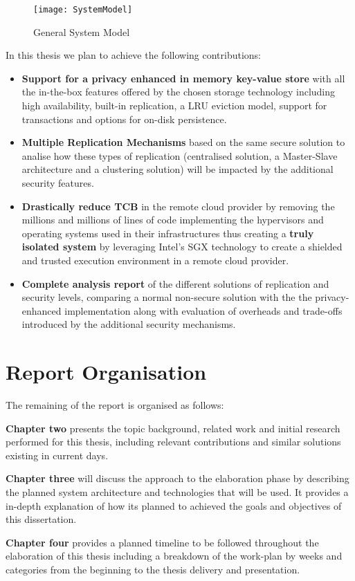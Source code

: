\begin{figure}[htbp]
	\centering
	{\texttt{[image: SystemModel]}}%
	\caption{General System Model}
	\label{fig:system_model}
\end{figure}

In this thesis we plan to achieve the following contributions:

\begin{itemize}
  \item \textbf{Support for a privacy enhanced in memory key-value store} with all the in-the-box features offered by the chosen storage technology including high availability, built-in replication, a \gls{LRU} eviction model, support for transactions and options for on-disk persistence.
  \item \textbf{Multiple Replication Mechanisms} based on the same secure solution to analise how these types of replication (centralised solution, a Master-Slave architecture and a clustering solution) will be impacted by the additional security features.
  \item \textbf{Drastically reduce TCB} in the remote cloud provider by removing the millions and millions of lines of code implementing the hypervisors and operating systems used in their infrastructures thus creating a \textbf{truly isolated system} by leveraging Intel's \gls{SGX} technology to create a shielded and trusted execution environment in a remote cloud provider.
  \item \textbf{Complete analysis report} of the different solutions of replication and security levels, comparing a normal non-secure solution with the the privacy-enhanced implementation along with evaluation of overheads and trade-offs introduced by the additional security mechanisms.
\end{itemize}

\section{Report Organisation}
\label{sec:report_organisation}

The remaining of the report is organised as follows:

\textbf{Chapter two} presents the topic background, related work and initial research performed for this thesis, including relevant contributions and similar solutions existing in current days.

\textbf{Chapter three} will discuss the approach to the elaboration phase by describing the planned system architecture and technologies that will be used. It provides a in-depth explanation of how its planned to achieved the goals and objectives of this dissertation.

\textbf{Chapter four} provides a planned timeline to be followed throughout the elaboration of this thesis including a breakdown of the work-plan by weeks and categories from the beginning to the thesis delivery and presentation.
